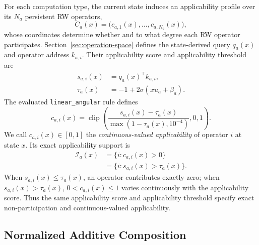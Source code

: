 \documentclass{article}
\begin{document}
For each computation type, the current state induces an applicability profile
over its \(N_a\) persistent RW operators,
\begin{equation}
C_a(x)=\big(c_{a,1}(x),\ldots,c_{a,N_a}(x)\big),
\label{eq:applicability_profile}
\end{equation}
whose coordinates determine whether and to what degree each RW operator
participates. Section~\ref{sec:operation-space} defines the state-derived query
\(q_a(x)\) and operator address \(k_{a,i}\). Their applicability score and
applicability threshold are
\begin{align}
s_{a,i}(x)&=q_a(x)^\top k_{a,i},\\
\tau_a(x)&=-1+2\sigma\!\left(xu_a+\beta_a\right).
\label{eq:applicability_score_threshold}
\end{align}
The evaluated \texttt{linear\_angular} rule defines
\begin{equation}
c_{a,i}(x)=
\operatorname{clip}\!\left(
\frac{s_{a,i}(x)-\tau_a(x)}
{\max(1-\tau_a(x),10^{-4})},0,1\right).
\label{eq:applicability}
\end{equation}
We call \(c_{a,i}(x)\in[0,1]\) the \emph{continuous-valued applicability}
of operator \(i\) at state \(x\). Its exact applicability support is
\begin{equation}
\begin{aligned}
\mathcal{I}_a(x)
&=\{i:c_{a,i}(x)>0\}\\
&=\{i:s_{a,i}(x)>\tau_a(x)\}.
\end{aligned}
\label{eq:applicable_support}
\end{equation}
When \(s_{a,i}(x)\leq\tau_a(x)\), an operator contributes exactly zero; when
\(s_{a,i}(x)>\tau_a(x)\), \(0<c_{a,i}(x)\leq1\) varies continuously with the
applicability score. Thus the same applicability score and applicability
threshold specify exact non-participation and continuous-valued applicability.

\subsection{Normalized Additive Composition}
\label{sec:operator-composition}
\end{document}
